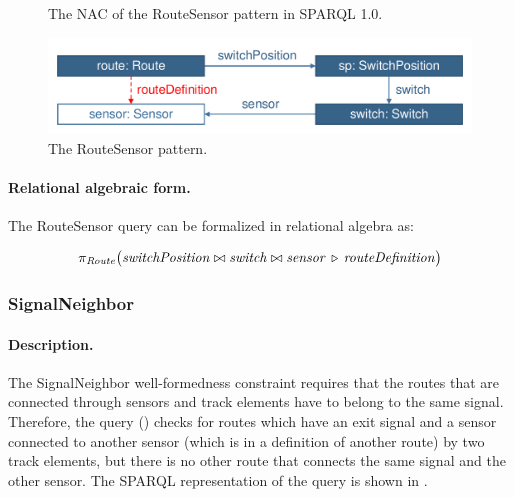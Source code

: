 \begin{figure}[htb]
\centering
\begin{minipage}{0.6\textwidth}
  { \alignListing
    }
  \caption{The NAC of the \textsf{RouteSensor} pattern in SPARQL 1.0.}
  \label{lst:routesensor-sparql-nac10}
\end{minipage}
\end{figure}

\begin{figure}[htb]
		\centering
		\includegraphics[scale=0.4]{figures/trainbenchmark-routesensor}
		\caption{The \textsf{RouteSensor} pattern.}
		\label{fig:trainbenchmark-routesensor}
\end{figure}

\paragraph{Relational algebraic form.}  The \textsf{RouteSensor} query can be formalized in relational algebra as:

\[
\pi_{\mathit{Route}} \big( \mathit{switchPosition} \bowtie \mathit{switch} \bowtie \mathit{sensor} \, \triangleright \, \mathit{routeDefinition} \big)
\]

\subsubsection{SignalNeighbor}

\paragraph{Description.} The \textsf{SignalNeighbor} well-formedness constraint requires that the routes that are connected through sensors and track elements have to belong to the same signal. Therefore, the query () checks for routes which have an exit signal and a sensor connected to another sensor (which is in a definition of another route) by two track elements, but there is no other route that connects the same signal and the other sensor. The SPARQL representation of the query is shown in .

